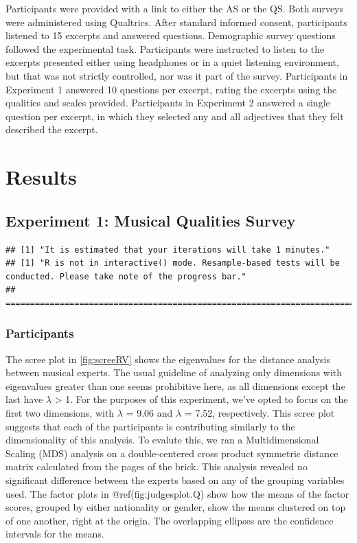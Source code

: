 \documentclass[
  english,
  man,floatsintext]{apa6}
\begin{document}
Participants were provided with a link to either the AS or the QS. Both surveys were administered using Qualtrics. After standard informed consent, participants listened to 15 excerpts and answered questions. Demographic survey questions followed the experimental task. Participants were instructed to listen to the excerpts presented either using headphones or in a quiet listening environment, but that was not strictly controlled, nor was it part of the survey. Participants in Experiment 1 answered 10 questions per excerpt, rating the excerpts using the qualities and scales provided. Participants in Experiment 2 answered a single question per excerpt, in which they selected any and all adjectives that they felt described the excerpt.

\hypertarget{results}{%
\section{Results}\label{results}}

\hypertarget{experiment-1-musical-qualities-survey}{%
\subsection{Experiment 1: Musical Qualities Survey}\label{experiment-1-musical-qualities-survey}}

\begin{verbatim}
## [1] "It is estimated that your iterations will take 1 minutes."
## [1] "R is not in interactive() mode. Resample-based tests will be conducted. Please take note of the progress bar."
## ================================================================================
\end{verbatim}

\hypertarget{participants-1}{%
\subsubsection{Participants}\label{participants-1}}

The scree plot in \ref{fig:screeRV} shows the eigenvalues for the distance analysis between musical experts. The usual guideline of analyzing only dimensions with eigenvalues greater than one seems prohibitive here, as all dimensions except the last have \(\lambda\) \textgreater{} 1. For the purposes of this experiment, we've opted to focus on the first two dimensions, with \(\lambda\) = 9.06 and \(\lambda\) = 7.52, respectively. This scree plot suggests that each of the participants is contributing similarly to the dimensionality of this analysis. To evalute this, we ran a Multidimensional Scaling (MDS) analysis on a double-centered cross product symmetric distance matrix calculated from the pages of the brick. This analysis revealed no significant difference between the experts based on any of the grouping variables used. The factor plots in @ref(fig:judgesplot.Q) show how the means of the factor scores, grouped by either nationality or gender, show the means clustered on top of one another, right at the origin. The overlapping ellipses are the confidence intervals for the means.
\end{document}

